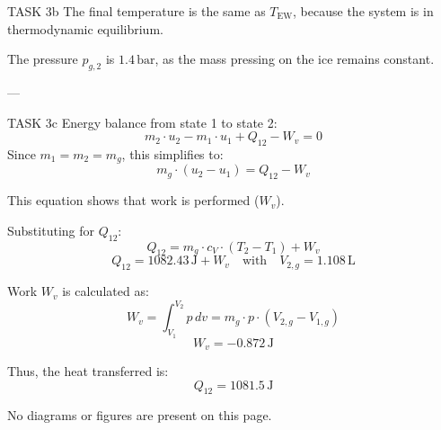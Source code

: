 TASK 3b  
The final temperature is the same as \( T_{\text{EW}} \), because the system is in thermodynamic equilibrium.

The pressure \( p_{g,2} \) is \( 1.4 \, \text{bar} \), as the mass pressing on the ice remains constant.

---

TASK 3c  
Energy balance from state 1 to state 2:  
\[
m_2 \cdot u_2 - m_1 \cdot u_1 + Q_{12} - W_v = 0
\]  
Since \( m_1 = m_2 = m_g \), this simplifies to:  
\[
m_g \cdot (u_2 - u_1) = Q_{12} - W_v
\]  

This equation shows that work is performed (\( W_v \)).

Substituting for \( Q_{12} \):  
\[
Q_{12} = m_g \cdot c_V \cdot (T_2 - T_1) + W_v
\]  
\[
Q_{12} = 1082.43 \, \text{J} + W_v \quad \text{with} \quad V_{2,g} = 1.108 \, \text{L}
\]  

Work \( W_v \) is calculated as:  
\[
W_v = \int_{V_1}^{V_2} p \, dv = m_g \cdot p \cdot (V_{2,g} - V_{1,g})
\]  
\[
W_v = -0.872 \, \text{J}
\]  

Thus, the heat transferred is:  
\[
Q_{12} = 1081.5 \, \text{J}
\]  

No diagrams or figures are present on this page.